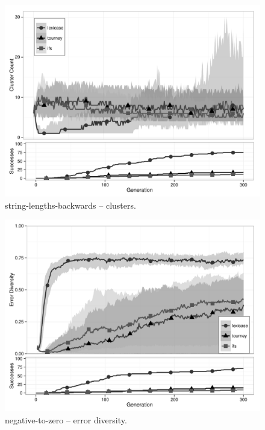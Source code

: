 \begin{figure}[p] %
\centering
\includegraphics[width=11.5cm]{string-lengths-backwards-cluster.pdf}
\caption{string-lengths-backwards -- clusters.}
\label{string-lengths-backwardsClu}
\end{figure}

\begin{figure}[p] %
\centering
\includegraphics[width=11.5cm]{negative-to-zero-diversity.pdf}
\caption{negative-to-zero -- error diversity.}
\label{negative-to-zeroDiv}
\end{figure}

